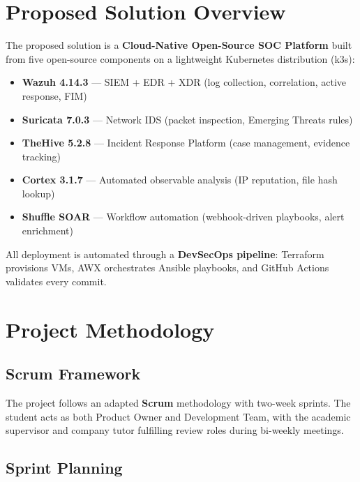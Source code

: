 \documentclass[12pt,a4paper]{report}
\begin{document}
\section{Proposed Solution Overview}

The proposed solution is a \textbf{Cloud-Native Open-Source SOC Platform} built from five open-source components on a lightweight Kubernetes distribution (k3s):

\begin{itemize}
  \item \textbf{Wazuh 4.14.3} --- SIEM + EDR + XDR (log collection, correlation, active response, FIM)
  \item \textbf{Suricata 7.0.3} --- Network IDS (packet inspection, Emerging Threats rules)
  \item \textbf{TheHive 5.2.8} --- Incident Response Platform (case management, evidence tracking)
  \item \textbf{Cortex 3.1.7} --- Automated observable analysis (IP reputation, file hash lookup)
  \item \textbf{Shuffle SOAR} --- Workflow automation (webhook-driven playbooks, alert enrichment)
\end{itemize}

All deployment is automated through a \textbf{DevSecOps pipeline}: Terraform provisions VMs, AWX orchestrates Ansible playbooks, and GitHub Actions validates every commit.

\section{Project Methodology}

\subsection{Scrum Framework}

The project follows an adapted \textbf{Scrum} methodology with two-week sprints. The student acts as both Product Owner and Development Team, with the academic supervisor and company tutor fulfilling review roles during bi-weekly meetings.

\subsection{Sprint Planning}
\end{document}
